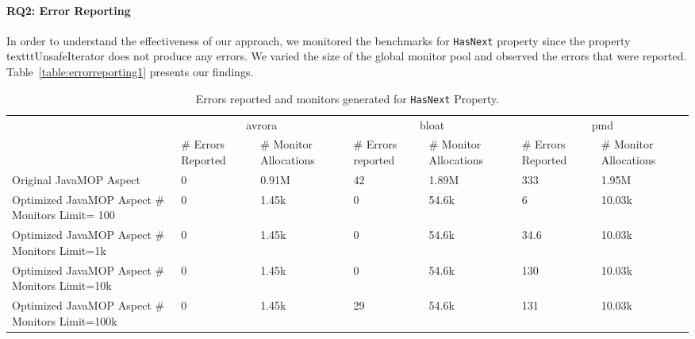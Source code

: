 \paragraph{RQ2: Error Reporting}

In order to understand the effectiveness of our approach, we monitored the benchmarks for \texttt{HasNext} property since the property texttt{UnsafeIterator} does not produce
any errors. We varied the size of the global monitor pool and observed the errors that were reported. Table~\ref{table:errorreporting1} presents our findings.



\begin{table*}[!ht]
\centering
\begin{tabular}{|p{3.7cm}|p{1.2cm}|p{1.5cm}|p{1.2cm}|p{1.5cm}|p{1.2cm}|p{1.5cm}|}
\hline
\multirow{2}{*}{}               & \multicolumn{2}{c|}{avrora}             & \multicolumn{2}{c|}{bloat}            & \multicolumn{2}{c|}{pmd}              \\ \cline{2-7} 
                                       & \# Errors Reported  & \# Monitor Allocations & \# Errors reported & \# Monitor Allocations& \# Errors Reported & \# Monitor Allocations\\ \hline
Original JavaMOP Aspect                                                    & 0              & 0.91M         & 42          & 1.89M            & 333               & 1.95M     \\ \hline
Optimized JavaMOP Aspect  \# Monitors Limit= 100            & 0             & 1.45k           & 0            & 54.6k              & 6                  & 10.03k       \\ \hline
Optimized JavaMOP Aspect  \# Monitors Limit=1k           & 0             & 1.45k           & 0            & 54.6k             & 34.6              & 10.03k       \\ \hline
Optimized JavaMOP Aspect  \# Monitors Limit=10k        & 0             & 1.45k           & 0            & 54.6k             & 130               & 10.03k       \\ \hline
Optimized JavaMOP Aspect  \# Monitors Limit=100k      & 0             & 1.45k           & 29          & 54.6k             & 131               & 10.03k       \\ \hline
\end{tabular}
\caption{Errors reported and monitors generated for \texttt{HasNext} Property.}
\end{table*}
\label{table:errorreporting1}

